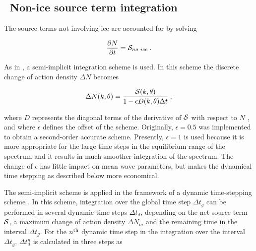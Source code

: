 \vssub
\subsection{~Non-ice source term integration} \label{sub:source}
\vssub

The source terms not involving ice are accounted for by solving


\begin{equation}
\frac{\p N}{\p t} = \cS_{no~ice} \: . \label{eq:step_source}
\end{equation}

\noindent 
As in \wam, a semi-implicit integration scheme is used. In this scheme the
discrete change of action density $\Delta N$ becomes \citep{art:WAM88}


\begin{equation}
\Delta N(k,\theta) = \frac{\cS(k,\theta)}{1- \epsilon D(k,\theta)\Delta t}
\: , \label{eq:implicit_st} \end{equation}

\noindent 
where $D$ represents the diagonal terms of the derivative of ${\cal S}$ with
respect to $N$ \citep[Eqs. 4.1 through 4.10]{art:WAM88}, and where $\epsilon$
defines the offset of the scheme. Originally, $\epsilon = 0.5$ was implemented
to obtain a second-order accurate scheme. Presently, $\epsilon = 1$ is used because it is more appropriate for the large time steps in the equilibrium range of
the spectrum \citep{pro:HA98,art:HA01} and it results in much smoother
integration of the spectrum. The change of $\epsilon$ has little impact on
mean wave parameters, but makes the dynamical time stepping as described below
more economical.

The semi-implicit scheme is applied in the framework of a dynamic
time-stepping scheme \citep{tol:JPO92}. In this scheme, integration over the
global time step $\Delta t_g$ can be performed in several dynamic time steps
$\Delta t_d$, depending on the net source term ${\cal S}$, a maximum change of
action density $\Delta N_m$ and the remaining time in the interval $\Delta
t_g$. For the $n^{\rm th}$ dynamic time step in the integration over the
interval $\Delta t_g$, $\Delta t_d^n$ is calculated in three steps as


